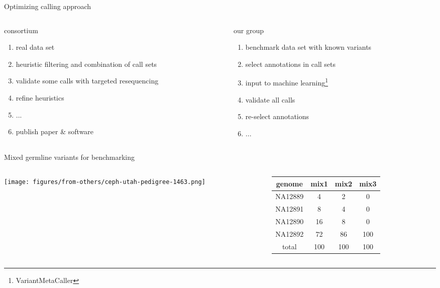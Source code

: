 \documentclass{beamer}
\begin{document}
\begin{frame}{Optimizing calling approach}
\begin{columns}[t]
\begin{column}{0.5\textwidth}
consortium
\begin{enumerate}
\item real data set
\item heuristic filtering and combination of call sets
\item validate some calls with targeted resequencing 
\item refine heuristics
\item ...  
\item publish paper \& software
\end{enumerate}
\end{column}

\begin{column}{0.5\textwidth}
our group
\begin{enumerate}
\item benchmark data set with known variants
\item select annotations in call sets
\item input to machine learning\footnote{VariantMetaCaller}
\item validate all calls
\item re-select annotations 
\item ...
\end{enumerate}
\end{column}
\end{columns}
\end{frame}

\begin{frame}[label=benchmark]{Mixed germline variants for benchmarking}
\begin{center}
\begin{columns}[t]
\begin{column}{0.5\textwidth}

\texttt{[image: figures/from-others/ceph-utah-pedigree-1463.png]}
\end{column}

\begin{column}{0.5\textwidth}

\small
{
\begin{tabular}{cccc}
genome & mix1 & mix2 & mix3\\
\hline
NA12889 & 4 & 2 & 0\\
NA12891 & 8 & 4 & 0\\
NA12890 & 16 & 8 & 0\\
NA12892 & 72 & 86 & 100\\
\hline
total & 100 & 100 & 100\\
\end{tabular}
}
\end{column}
\end{columns}
\end{center}
\end{frame}
\end{document}
